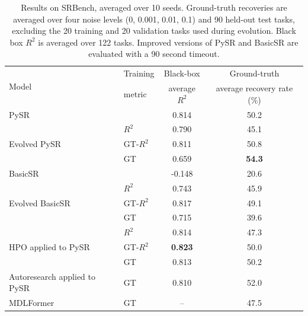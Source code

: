 \begin{table}[t]
\caption{Results on SRBench, averaged over 10 seeds. Ground-truth recoveries are averaged over four noise levels (0, 0.001, 0.01, 0.1) and 90 held-out test tasks, excluding the 20 training and 20 validation tasks used during evolution. Black box $R^2$ is averaged over 122 tasks. Improved versions of PySR and BasicSR are evaluated with a 90 second timeout.}
\label{tab:srbench}
\centering
\scriptsize
\begin{tabular}{llcc}
\toprule

\multicolumn{1}{l}{\multirow{2}{*}{Model}} &
\multicolumn{1}{l}{Training} &
\multicolumn{1}{c}{Black-box} &
\multicolumn{1}{c}{Ground-truth} \\

& \multicolumn{1}{l}{metric}
 & \multicolumn{1}{c}{average $R^2$}
& \multicolumn{1}{c}{average recovery rate (\%)} \\

\midrule
PySR &  & 0.814 & 50.2 \\

\midrule
\multirow[c]{3}{*}{Evolved PySR}
& $R^2$    & 0.790 & 45.1 \\
& GT-$R^2$ & 0.811 & 50.8 \\
& GT       & 0.659 & \bf 54.3 \\

\midrule
BasicSR &  & -0.148 & 20.6 \\

\midrule
\multirow[c]{3}{*}{Evolved BasicSR}
& $R^2$    & 0.743 & 45.9 \\
& GT-$R^2$ & 0.817 & 49.1 \\
& GT       & 0.715 & 39.6 \\

\midrule
\multirow[c]{3}{*}{HPO applied to PySR}
& $R^2$    & 0.814 & 47.3 \\
& GT-$R^2$ & \bf 0.823 & 50.0 \\
& GT       & 0.813 & 50.2 \\

\midrule
Autoresearch applied to PySR & GT & 0.810 & 52.0 \\

\midrule
MDLFormer & GT & -- & 47.5 \\

\bottomrule
\end{tabular}
\end{table}
